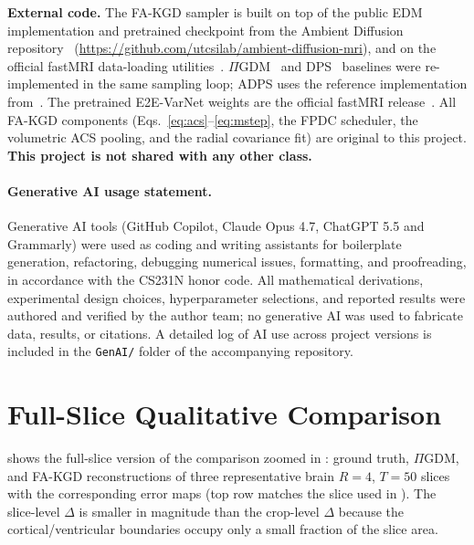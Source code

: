 \documentclass[10pt,twocolumn,letterpaper]{article}
\begin{document}
\textbf{External code.} The FA-KGD sampler is built on top of the public EDM
implementation and pretrained checkpoint from the Ambient Diffusion
repository~\cite{daras2025ambient} (\url{https://github.com/utcsilab/ambient-diffusion-mri}),
and on the official fastMRI data-loading utilities~\cite{zbontar2018fastmri}.
$\Pi$GDM~\cite{song2023pigdm} and DPS~\cite{chung2023dps} baselines were
re-implemented in the same sampling loop; ADPS uses the reference
implementation from~\cite{daras2025ambient}. The pretrained E2E-VarNet
weights are the official fastMRI release~\cite{sriram2020varnet}. All FA-KGD
components (Eqs.~\ref{eq:acs}--\ref{eq:mstep}, the FPDC scheduler, the
volumetric ACS pooling, and the radial covariance fit) are original to this
project. \textbf{This project is not shared with any other class.}

\paragraph{Generative AI usage statement.}
Generative AI tools (GitHub Copilot, Claude Opus 4.7, ChatGPT 5.5 and Grammarly) were used as coding and writing assistants for boilerplate generation, refactoring, debugging numerical issues, formatting, and proofreading, in accordance with the CS231N honor code. All mathematical derivations, experimental design choices, hyperparameter selections, and reported results were authored and verified by the author team; no generative AI was used to fabricate data, results, or citations. A detailed log of AI use across project versions is included in the \texttt{GenAI/} folder of the accompanying repository.




\appendix

\section{Full-Slice Qualitative Comparison}
\label{app:fullslice}

 shows the full-slice version of the comparison
zoomed in : ground truth, $\Pi$GDM, and FA-KGD
reconstructions of three representative brain $R{=}4$, $T{=}50$ slices
with the corresponding error maps (top row matches the slice used in
). The slice-level $\Delta$ is smaller in
magnitude than the crop-level $\Delta$ because the cortical/ventricular
boundaries occupy only a small fraction of the slice area.
\end{document}
